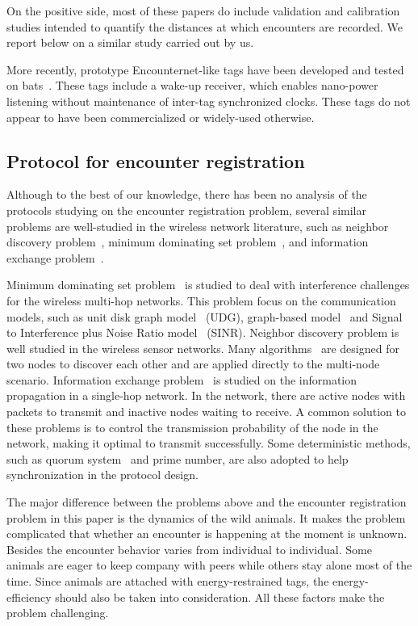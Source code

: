 On the positive side, most of these papers do include validation and calibration studies intended to quantify the distances
at which encounters are recorded. We report below on a similar study carried out by us.

More recently, prototype Encounternet-like tags have been developed and tested on
bats~\cite{Ripperger2016ProximitySensing,dressler2016bats}. These tags include a wake-up receiver, which
enables nano-power listening without maintenance of inter-tag synchronized clocks. These tags  
do not appear to have been commercialized or widely-used otherwise.

\subsection{Protocol for encounter registration}

Although to the best of our knowledge, there has been no analysis of the protocols 
studying on the encounter registration problem,
several similar problems are well-studied in the wireless network literature, 
such as  
neighbor discovery problem~\cite{Bakht2012Searchlight, Sun2014Hello,Chen2015On}, 
minimum dominating set problem~\cite{Scheideler2008An,Yu2013Review},
and information exchange problem~\cite{Capetanakis1979Tree,Daum2013Maximal,Yu2017Uniform}.

Minimum dominating set problem~\cite{Scheideler2008An,Yu2013Review} is studied to 
deal with interference challenges for the wireless multi-hop networks.
This problem focus on the communication models, such as unit disk graph model~\cite{Lebhar2009Unit} (UDG),
graph-based model~\cite{De2007A} and Signal to Interference plus Noise Ratio model~\cite{Lee2007Signal} (SINR).
Neighbor discovery problem is well studied in the wireless sensor 
networks. Many algorithms~\cite{Bakht2012Searchlight, Sun2014Hello,Chen2015On} 
are designed for two nodes to discover each other and 
are applied directly to the multi-node scenario.
Information exchange problem~\cite{Capetanakis1979Tree,Daum2013Maximal,Yu2017Uniform} is 
studied on the information propagation in a single-hop network. 
In the network, there are active nodes with packets to transmit 
and inactive nodes waiting to receive.
A common solution to these problems is to control the transmission probability of the node in the 
network, making it optimal to transmit successfully.
Some deterministic methods, such as quorum system~\cite{Peleg1995The} and prime number, are also 
adopted to help synchronization in the protocol design.

The major difference between the problems above and the encounter registration problem
in this paper is the dynamics of the wild animals. It makes the problem complicated that whether an encounter is happening at the moment is unknown.
Besides the encounter behavior varies from individual to individual. Some animals are eager to 
keep company with peers while others stay alone most of the time.
Since animals are attached with energy-restrained
tags, the energy-efficiency should also be taken into consideration.
All these factors make the problem challenging.
  

